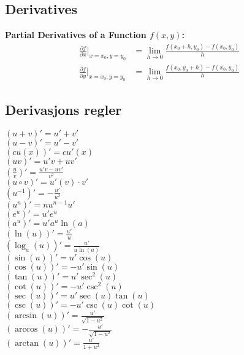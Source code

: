 \documentclass[a4paper,7pt,fleqn]{article}
\begin{document}
\newpage
\begin{multicols}{2}
\section{Derivatives}

\begin{minipage}{\linewidth}

\textbf{Partial Derivatives of a Function $f(x, y)$:}
\begin{align*}
    \frac{\partial f}{\partial x} \Bigg|_{x=x_0, y=y_0} &= \lim_{h \to 0} \frac{f(x_0 + h, y_0) - f(x_0, y_0)}{h} \\[0.3cm]
    \frac{\partial f}{\partial y} \Bigg|_{x=x_0, y=y_0} &= \lim_{h \to 0} \frac{f(x_0, y_0 + h) - f(x_0, y_0)}{h}
\end{align*}
\end{minipage}


\begin{minipage} {\linewidth}


    
\subsection{Derivasjons regler}
\((u + v)' = u' + v' \) \\
\((u - v)' = u' - v' \) \\
\((cu(x))' = cu'(x) \) \\
\((uv)' = u'v + uv' \) \\
\((\frac{u}{v})' = \frac{u'v - uv'}{v^2} \) \\
\((u \circ v)' = u'(v) \cdot v' \) \\
\((u^{-1})' = -\frac{u'}{u^2} \) \\
\((u^n)' = nu^{n-1}u' \) \\
\((e^u)' = u'e^u \) \\
\((a^u)' = u'a^u \ln(a) \) \\
\((\ln(u))' = \frac{u'}{u} \) \\
\((\log_a(u))' = \frac{u'}{u \ln(a)} \) \\
\((\sin(u))' = u'\cos(u) \) \\
\((\cos(u))' = -u'\sin(u) \) \\
\((\tan(u))' = u'\sec^2(u) \) \\
\((\cot(u))' = -u'\csc^2(u) \) \\
\((\sec(u))' = u'\sec(u)\tan(u) \) \\
\((\csc(u))' = -u'\csc(u)\cot(u) \) \\
\((\arcsin(u))' = \frac{u'}{\sqrt{1-u^2}} \) \\
\((\arccos(u))' = -\frac{u'}{\sqrt{1-u^2}} \) \\
\((\arctan(u))' = \frac{u'}{1+u^2} \) \\





\end{minipage}
\end{multicols}
\end{document}

